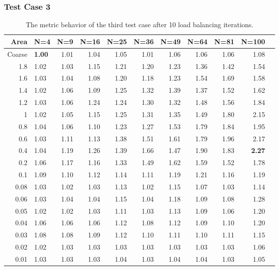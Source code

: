 \documentclass[]{beamer}
\begin{document}
\begin{frame}[t]\frametitle{Test Case 3}
\begin{table}[H]
\tiny
\centering
\caption{The metric behavior of the third test case after 10 load balancing iterations.} 
\begin{tabular}{rlrrrrrrrrr}
  \hline
  Area & N=4 & N=9 & N=16 & N=25 & N=36 & N=49 & N=64 & N=81 & N=100 \\ 
  \hline
 Coarse & \textbf{\cellcolor{blue!25}1.00} & 1.01 & 1.04 & 1.05 & 1.01 & 1.06 & 1.06 & 1.06 & 1.08 \\ 
1.8 & 1.02 & 1.03 & 1.15 & 1.21 & 1.20 & 1.23 & 1.36 & 1.42 & 1.54 \\ 
  1.6 & 1.03 & 1.04 & 1.08 & 1.20 & 1.18 & 1.23 & 1.54 & 1.69 & 1.58 \\ 
1.4 & 1.02 & 1.06 & 1.09 & 1.25 & 1.32 & 1.39 & 1.37 & 1.52 & 1.62 \\ 
 1.2 & 1.03 & 1.06 & 1.24 & 1.24 & 1.30 & 1.32 & 1.48 & 1.56 & 1.84 \\ 
 1 & 1.02 & 1.05 & 1.15 & 1.25 & 1.31 & 1.35 & 1.49 & 1.80 & 2.15 \\ 
 0.8 & 1.04 & 1.06 & 1.10 & 1.23 & 1.27 & 1.53 & 1.79 & 1.84 & 1.95 \\ 
 0.6 & 1.03 & 1.11 & 1.13 & 1.38 & 1.51 & 1.61 & 1.79 & 1.96 & 2.17 \\ 
   0.4 & 1.04 & 1.19 & 1.26 & 1.39 & 1.66 & 1.47 & 1.90 & 1.83 & \textbf{\cellcolor{blue!25}2.27} \\ 
   0.2 & 1.06 & 1.17 & 1.16 & 1.33 & 1.49 & 1.62 & 1.59 & 1.52 & 1.78 \\ 
 0.1 & 1.09 & 1.10 & 1.12 & 1.14 & 1.11 & 1.19 & 1.21 & 1.16 & 1.19 \\ 
 0.08 & 1.03 & 1.02 & 1.03 & 1.13 & 1.02 & 1.15 & 1.07 & 1.03 & 1.14 \\ 
  0.06 & 1.03 & 1.04 & 1.04 & 1.15 & 1.04 & 1.18 & 1.09 & 1.08 & 1.28 \\ 
   0.05 & 1.02 & 1.02 & 1.03 & 1.11 & 1.03 & 1.13 & 1.09 & 1.06 & 1.20 \\ 
   0.04 & 1.06 & 1.06 & 1.06 & 1.12 & 1.08 & 1.12 & 1.09 & 1.10 & 1.20 \\ 
 0.03 & 1.08 & 1.08 & 1.09 & 1.12 & 1.10 & 1.11 & 1.10 & 1.11 & 1.15 \\ 
0.02 & 1.02 & 1.03 & 1.03 & 1.03 & 1.03 & 1.03 & 1.03 & 1.03 & 1.06 \\ 
 0.01 & 1.03 & 1.03 & 1.03 & 1.04 & 1.03 & 1.04 & 1.04 & 1.03 & 1.05 \\ 
   \hline
\end{tabular}
\end{table}
\end{frame}
\end{document}
